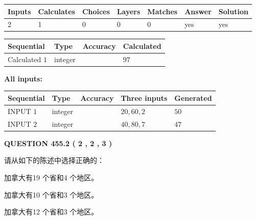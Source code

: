 \documentclass{ctexart}
\begin{document}
   
\noindent\begin{tabular}{|l|l|l|l|l|l|l|}
 \hline
Inputs & Calculates & Choices & Layers & Matches & Answer & Solution \\ \hline
 2  & 
 1  & 
 0
  & 
 0  & 
 0  & 
  yes & 
  yes 
  \\ \hline
 \end{tabular}
   
   
   
   
\noindent{}
   
   
  
  
\noindent\begin{tabular}{|l|l|l|l|}
\hline
 Sequential & Type & Accuracy & Calculated \\ 
\hline
 
 
  Calculated $  1 $ & integer &  & 
  $ 97 $ 
 \\  \hline  
 \end{tabular}
   
   
   
   
\noindent\vspace{0.1in}\hspace{-0.08in} {\textbf{\Large{All inputs: }}}
   
   
  
  
\noindent\begin{tabular}{|l|l|l|l|l|}
\hline
 Sequential & Type & Accuracy & Three inputs & Generated \\ 
\hline
 
 
  INPUT $  1 $ & integer &  & $
 20
 , 
 60
 , 
 2
 $ & $ 50 $ 
 \\  \hline  
 
 
  INPUT $  2 $ & integer &  & $
 40
 , 
 80
 , 
 7
 $ & $ 47 $ 
 \\  \hline  
 \end{tabular}
   
   
  
\vspace{0.2in}
  
{\textbf{\Large{QUESTION
455.2 
 ( 2 , 2 , 3 )
}}}
  
  
请从如下的陈述中选择正确的：
 
 
加拿大有19 个省和4 个地区。
 
 
加拿大有10 个省和3 个地区。
 
 
加拿大有12 个省和3 个地区。
 
\end{document}
